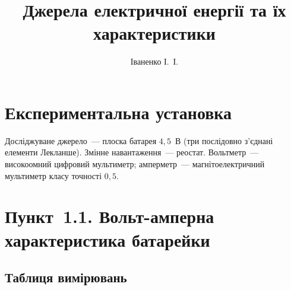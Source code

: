 \documentclass{LabWork}
\title{Джерела електричної енергії та їх характеристики}
\author{Іваненко І.~І.}{}
\begin{document}
\writedatatofile{\jobname}
\maketitle

\section{Експериментальна установка}

Досліджуване джерело~--- плоска батарея $4{,}5$~В (три послідовно з'єднані елементи Лекланше). Змінне навантаження~--- реостат. Вольтметр~--- високоомний цифровий мультиметр; амперметр~--- магнітоелектричний мультиметр класу точності $0{,}5$.

\section{Пункт~1.1. Вольт-амперна характеристика батарейки}

%

\subsection*{Таблиця вимірювань}
\end{document}
